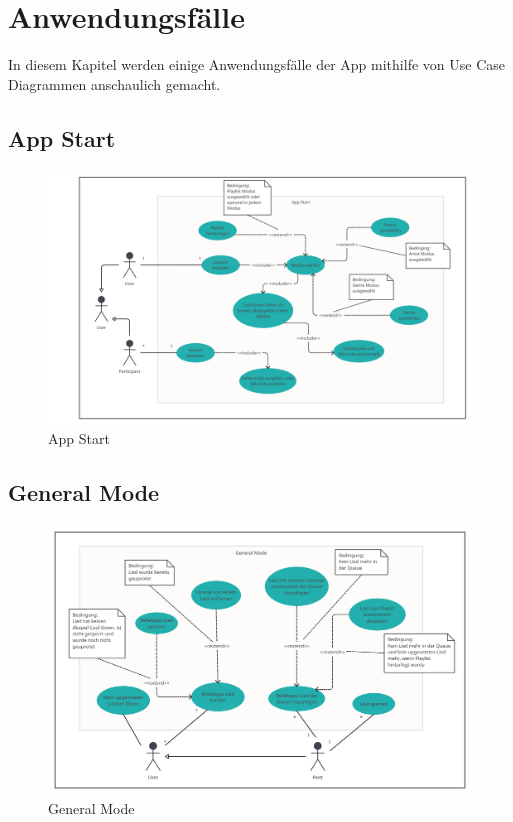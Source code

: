 \documentclass[oneside, ngerman]{sdqtechreport}
\begin{document}
\chapter{Anwendungsfälle}
\label{chap:Anwendungsfälle}

In diesem Kapitel werden einige Anwendungsfälle der App mithilfe von Use Case Diagrammen anschaulich gemacht.

\section{App Start}
\label{sec:Anwendungsfälle:App Start}

\begin{figure}[h]
    \includegraphics[width = 18cm]{LATEX/Pflichtenheft/GraphicDesigns/Use Case App Start.png}
    \caption{App Start}
    \label{fig:Use Case App Start}
\end{figure}

\newpage

\section{General Mode}
\label{sec:Anwendungsfälle:General Mode}

\begin{figure}[h]
    \includegraphics[width = 18cm]{LATEX/Pflichtenheft/GraphicDesigns/Use Case General Mode.png}
    \caption{General Mode}
    \label{fig:Use Case General Mode}
\end{figure}
\end{document}
